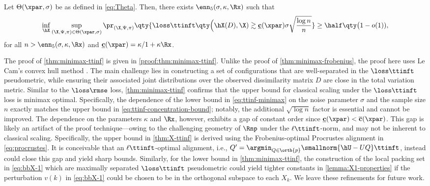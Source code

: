 \documentclass[10pt]{article}
\begin{document}
\begin{theorem}\label{thm:minimax-ttinf}
    Let $\Theta(\xpar, \sigma)$ be as defined in \cref{eq:Theta}. Then, there exists $\enn_5(\sigma, \kappa, \Rx)$ such that
    \begin{align}
        \inf_{\hX}\sup_{(\X, \Psi, \pi) \in \Theta(\xpar, \sigma)} \pr_{(\X, \Psi, \pi)}\qty{ \loss\ttinft\qty\Big(\hX(D), \X) \gtrsim \textbf{\underline{c}}(\xpar) \sigma\sqrt{\frac{\log{n}}{n}} } \ge \half \qty\big(1 - o(1)),\label{eq:ttinf-minimax}
    \end{align}
    for all ${n > \enn_5(\sigma, \kappa, \Rx)}$ and $\textbf{\underline{c}}(\xpar) = {\kappa}/{1 + \kappa\Rx}$.
\end{theorem}

The proof of \cref{thm:minimax-ttinf} is given in \cref{proof:thm:minimax-ttinf}. Unlike the proof of \cref{thm:minimax-frobenius}, the proof here uses Le Cam's convex hull method \citep{yu1997assouad}. The main challenge lies in constructing a set of configurations that are well-separated in the $\loss\ttinft$ pseudometric, while ensuring their associated joint distributions over the observed dissimilarity matrix $D$ are close in the total variation metric. Similar to the  $\loss\rmse$ loss, \cref{thm:minimax-ttinf} confirms that the upper bound for classical scaling under the $\loss\ttinft$ loss is minimax optimal. Specifically, the dependence of the lower bound in \cref{eq:ttinf-minimax} on the noise parameter $\sigma$ and the sample size $n$ exactly matches the upper bound in \cref{eq:ttinf-concentration-bound}; notably, the additional $\sqrt{\log{n}}$ factor is essential and cannot be improved. The dependence on the parameters $\kappa$ and $\Rx$, however, exhibits a gap of constant order since $\textbf{\underline{c}}(\xpar) < \mathbf{\overline{c}}(\xpar)$. This gap is likely an artifact of the proof technique---owing to the challenging  geometry of $\Rnp$ under the $\ell\ttinft$-norm, and may not be inherent to classical scaling. Specifically, the upper bound in \cref{thm:X-ttinf} is derived using the Frobenius-optimal Procrustes alignment in \cref{eq:procrustes}. It is conceivable that an $\ell\ttinft$-optimal alignment, i.e., $Q' = \argmin_{Q \in \orth{p}}\smallnorm{\hU - UQ}\ttinft$, instead could close this gap and yield sharp bounds. Similarly, for the lower bound in \cref{thm:minimax-ttinf}, the construction of the local packing set in \cref{eq:bbX-1} which are maximally separated $\loss\ttinft$ pseudometric could yield tighter constants in \cref{lemma:X1-properties} if the perturbation $v(k)$ in \cref{eq:bbX-1} could be chosen to be in the orthogonal subspace to each $X_k$. We leave these refinements for future work.
\end{document}
